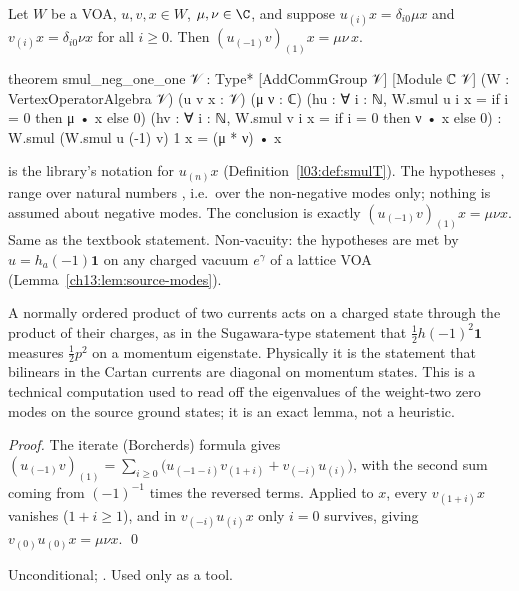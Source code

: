 \begin{lemma}\label{ch13:lem:smul-neg-one}
Let $W$ be a VOA, $u,v,x\in W$, $\mu,\nu\in\C$, and suppose $u_{(i)}x=\delta_{i0}\mu x$ and
$v_{(i)}x=\delta_{i0}\nu x$ for all $i\ge0$. Then $(u_{(-1)}v)_{(1)}x=\mu\nu\,x$.
\end{lemma}
\begin{leancode}
theorem smul_neg_one_one {𝒱 : Type*} [AddCommGroup 𝒱] [Module ℂ 𝒱] (W : VertexOperatorAlgebra 𝒱)
    (u v x : 𝒱) (μ ν : ℂ) (hu : ∀ i : ℕ, W.smul u i x = if i = 0 then μ • x else 0)
    (hv : ∀ i : ℕ, W.smul v i x = if i = 0 then ν • x else 0) :
    W.smul (W.smul u (-1) v) 1 x = (μ * ν) • x
\end{leancode}
\begin{dictionary}
 is the library's notation for $u_{(n)}x$ (Definition~\ref{l03:def:smulT}). The hypotheses
,  range over natural numbers , i.e.\ over the non-negative modes only;
nothing is assumed about negative modes. The conclusion is exactly $(u_{(-1)}v)_{(1)}x=\mu\nu x$.
Same as the textbook statement. Non-vacuity: the hypotheses are met by $u=h_a(-1)\mathbf 1$ on any
charged vacuum $e^\gamma$ of a lattice VOA (Lemma~\ref{ch13:lem:source-modes}).
\end{dictionary}
\begin{physics}
A normally ordered product of two currents acts on a charged state through the product of their charges, as in the Sugawara-type statement that $\tfrac12 h(-1)^2\mathbf 1$ measures $\tfrac12p^2$ on a momentum eigenstate. Physically it is the statement that bilinears in the Cartan currents are diagonal on momentum states. This is a technical computation used to read off the eigenvalues of the weight-two zero modes on the source ground states; it is an exact lemma, not a heuristic.
\end{physics}
\noindent\emph{Proof.} The iterate (Borcherds) formula gives
$(u_{(-1)}v)_{(1)}=\sum_{i\ge0}\bigl(u_{(-1-i)}v_{(1+i)}+v_{(-i)}u_{(i)}\bigr)$, with the second sum
coming from $(-1)^{-1}$ times the reversed terms. Applied to $x$, every $v_{(1+i)}x$ vanishes
($1+i\ge1$), and in $v_{(-i)}u_{(i)}x$ only $i=0$ survives, giving $v_{(0)}u_{(0)}x=\mu\nu x$.
\qed
\begin{status}
Unconditional; . Used only as a tool.
\end{status}

